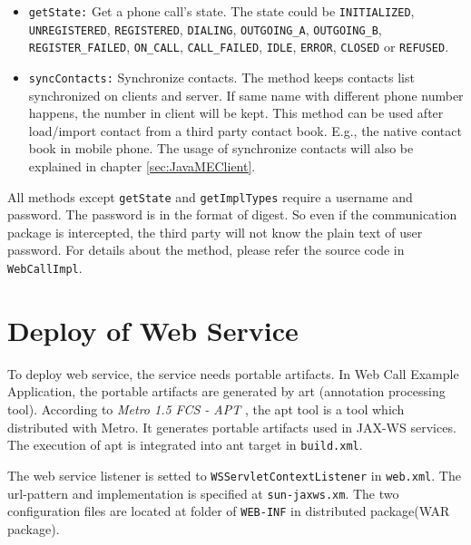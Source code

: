 \begin{itemize}
\item \texttt{getState:} Get a phone call's state. The state could be \texttt{INITIALIZED}, \texttt{UNREGISTERED}, \texttt{REGISTERED}, \texttt{DIALING}, \texttt{OUTGOING\_A}, \texttt{OUTGOING\_B}, \linebreak \texttt{REGISTER\_FAILED}, \texttt{ON\_CALL}, \texttt{CALL\_FAILED}, \texttt{IDLE}, \texttt{ERROR}, \texttt{CLOSED} or \texttt{REFUSED}.

\item \texttt{syncContacts:} Synchronize contacts. The method keeps contacts list synchronized on clients and server. If same name with different phone number happens, the number in client will be kept. This method can be used after load/import contact from a third party contact book. E.g., the native contact book in mobile phone. The usage of synchronize contacts will also be explained in chapter \ref{sec:JavaMEClient}.
\end{itemize}

All methods except \texttt{getState} and \texttt{getImplTypes} require a username and password. The password is in the format of digest. So even if the communication package is intercepted, the third party will not know the plain text of user password.
For details about the method, please refer the source code in \texttt{WebCallImpl}.

\section{Deploy of Web Service}

To deploy web service, the service needs portable artifacts. In Web Call Example Application, the portable artifacts are generated by \textsf{art} (annotation processing tool). According to \textit{Metro 1.5 FCS - APT} \cite{aptHomepage}, the \textsf{apt} tool is a tool which distributed with \textsf{Metro}. It generates portable artifacts used in JAX-WS services. The execution of apt is integrated into ant target in \texttt{build.xml}. 

The web service listener is setted to \texttt{WSServletContextListener} in \texttt{web.xml}. The url-pattern and implementation is specified at \texttt{sun-jaxws.xm}. The two configuration files are located at folder of \texttt{WEB-INF} in distributed package(WAR package). 




